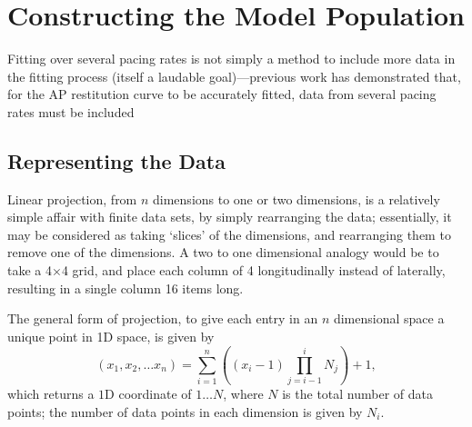 \documentclass[../thesis-main.tex]{subfiles}
\begin{document}
 \section{Constructing the Model Population}
 \label{sec:methods}
 Fitting over several pacing rates is not simply a method to include more data in the fitting process (itself a laudable goal)---previous work has demonstrated that, for the AP restitution curve to be accurately fitted, data from several pacing rates must be included \citep{Syed2005}
 
 \subsection{Representing the Data}
 \label{subsec:cbdr}
 Linear projection, from $n$ dimensions to one or two dimensions, is a relatively simple affair with finite data sets, by simply rearranging the data; essentially, it may be considered as taking `slices' of the dimensions, and rearranging them to remove one of the dimensions. A two to one dimensional analogy would be to take a 4$\times$4 grid, and place each column of 4 longitudinally instead of laterally, resulting in a single column 16 items long.
 
 The general form of projection, to give each entry in an $n$ dimensional space a unique point in 1D space, is given by
 \begin{equation}
  (x_1, x_2, \ldots x_n) = \sum_{i=1}^n\left((x_i-1)\prod_{j=i-1}^i N_j\right) + 1,
  \label{eq:paramSpace-projection}
 \end{equation}
 which returns a $1$D coordinate of $1\ldots{}N$, where $N$ is the total number of data points; the number of data points in each dimension is given by $N_i$.

 \biblio
 
 
\end{document}
